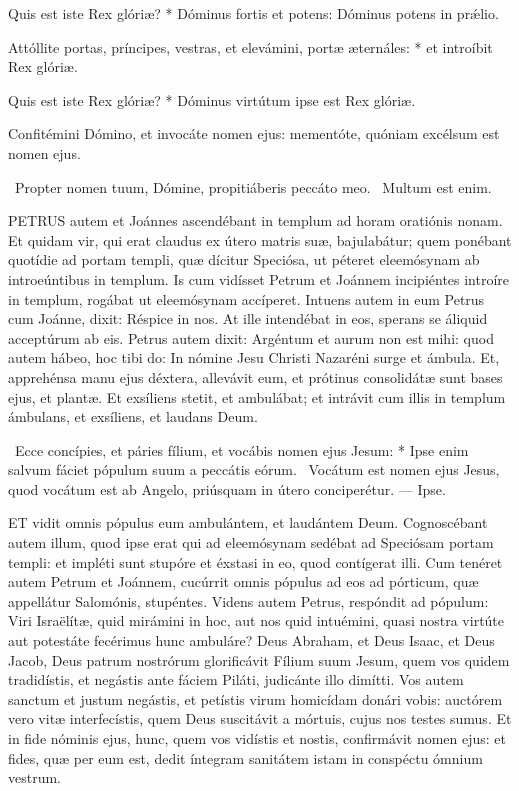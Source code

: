 Quis est iste Rex glóriæ? * Dóminus fortis et potens: Dóminus potens in prǽlio.

Attóllite portas, príncipes, vestras, et elevámini, portæ æternáles: * et introíbit Rex glóriæ.

Quis est iste Rex glóriæ? * Dóminus virtútum ipse est Rex glóriæ.

 Confitémini Dómino, et invocáte nomen ejus: mementóte, quóniam excélsum est nomen ejus.

\V\ Propter nomen tuum, Dómine, propitiáberis peccáto meo. \R\ Multum est enim.



\lettrine[lines=2]{P}{ETRUS} autem et Joánnes ascendébant in templum ad horam oratiónis nonam. Et quidam vir, qui erat claudus ex útero matris suæ, bajulabátur; quem ponébant quotídie ad portam templi, quæ dícitur Speciósa, ut péteret eleemósynam ab introeúntibus in templum. Is cum vidísset Petrum et Joánnem incipiéntes introíre in templum, rogábat ut eleemósynam accíperet. Intuens autem in eum Petrus cum Joánne, dixit: Réspice in nos. At ille intendébat in eos, sperans se áliquid acceptúrum ab eis. Petrus autem dixit: Argéntum et aurum non est mihi: quod autem hábeo, hoc tibi do: In nómine Jesu Christi Nazaréni surge et ámbula. Et, apprehénsa manu ejus déxtera, allevávit eum, et prótinus consolidátæ sunt bases ejus, et plantæ. Et exsíliens stetit, et ambulábat; et intrávit cum illis in templum ámbulans, et exsíliens, et laudans Deum.

\R\ Ecce concípies, et páries fílium, et vocábis nomen ejus Jesum: * Ipse enim salvum fáciet pópulum suum a peccátis eórum. \V\ Vocátum est nomen ejus Jesus, quod vocátum est ab Angelo, priúsquam in útero conciperétur. --- Ipse.


\lettrine[lines=2]{E}{T} vidit omnis pópulus eum ambulántem, et laudántem Deum. Cognoscébant autem illum, quod ipse erat qui ad eleemósynam sedébat ad Speciósam portam templi: et impléti sunt stupóre et éxstasi in eo, quod contígerat illi. Cum tenéret autem Petrum et Joánnem, cucúrrit omnis pópulus ad eos ad pórticum, quæ appellátur Salomónis, stupéntes. Videns autem Petrus, respóndit ad pópulum: Viri Israëlítæ, quid mirámini in hoc, aut nos quid intuémini, quasi nostra virtúte aut potestáte fecérimus hunc ambuláre? Deus Abraham, et Deus Isaac, et Deus Jacob, Deus patrum nostrórum glorificávit Fílium suum Jesum, quem vos quidem tradidístis, et negástis ante fáciem Piláti, judicánte illo dimítti. Vos autem sanctum et justum negástis, et petístis virum homicídam donári vobis: auctórem vero vitæ interfecístis, quem Deus suscitávit a mórtuis, cujus nos testes sumus. Et in fide nóminis ejus, hunc, quem vos vidístis et nostis, confirmávit nomen ejus: et fides, quæ per eum est, dedit íntegram sanitátem istam in conspéctu ómnium vestrum.


